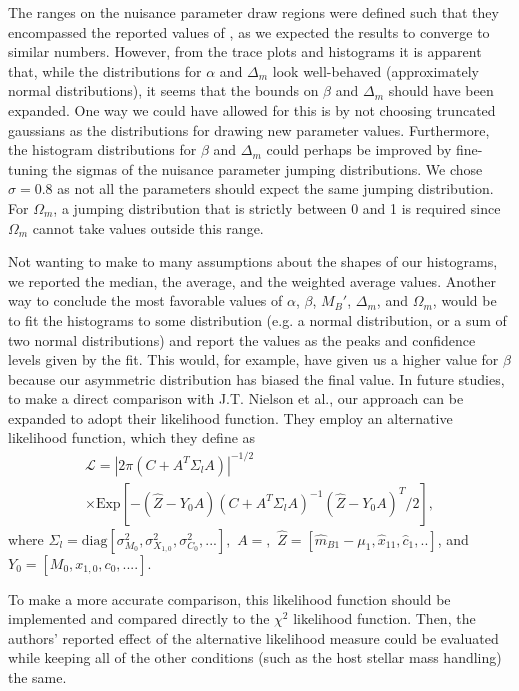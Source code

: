 \documentclass[aps,prl,reprint]{revtex4-1}
\begin{document}
The ranges on the nuisance parameter draw regions were defined such that they encompassed the reported values of \cite{sdss}, as we expected the results to converge to similar numbers. However, from the trace plots and histograms it is apparent that, while the distributions for $\alpha$ and $\Delta_m$ look well-behaved (approximately normal distributions), it seems that the bounds on $\beta$ and $\Delta_m$ should have been expanded. One way we could have allowed for this is by not choosing truncated gaussians as the distributions for drawing new parameter values. Furthermore, the histogram distributions for $\beta$ and $\Delta_m$ could perhaps be improved by fine-tuning the sigmas of the nuisance parameter jumping distributions. We chose $\sigma = 0.8$ as not all the parameters should expect the same jumping distribution. For $\Omega_m$, a jumping distribution that is strictly between 0 and 1 is required since $\Omega_m$ cannot take values outside this range.

Not wanting to make to many assumptions about the shapes of our histograms, we reported the median, the average, and the weighted average values. Another way to conclude the most favorable values of $\alpha$, $\beta$, $M_B'$, $\Delta_m$, and $\Omega_m$, would be to fit the histograms to some distribution (e.g. a normal distribution, or a sum of two normal distributions) and report the values as the peaks and confidence levels given by the fit. This would, for example, have given us a higher value for $\beta$ because our asymmetric distribution has biased the final value. In future studies, to make a direct comparison with J.T. Nielson et al., our approach can be expanded to adopt their likelihood function. 
They employ an alternative likelihood function, which they define as \begin{align*}\mathscr{L} = |2\pi(C+A^T \Sigma_l A)|^{-1/2}\; \\
\times \text{Exp}[-(\hat{Z}-Y_0A)(C+A^T\Sigma_lA)^{-1}(\hat{Z}-Y_0A)^T/2],\end{align*} where $\Sigma_l = \text{diag}[\sigma_{M_0}^2,\sigma_{X_{1,0}}^2,\sigma_{C_0}^2,...],$ $A = ,$ $\hat{Z} = [\hat{m}_{B1}-\mu_1, \hat{x}_{11},\hat{c}_1,..]$, and $Y_0 = [M_0,x_{1,0},c_0,....]$. 
\par To make a more accurate comparison, this likelihood function should be implemented and compared directly to the $\chi^2$ likelihood function. Then, the authors' reported effect of the alternative likelihood measure could be evaluated while keeping all of the other conditions (such as the host stellar mass handling) the same. 
\end{document}
